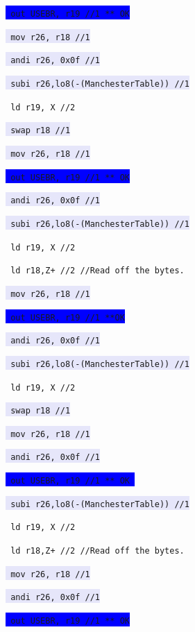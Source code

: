 \documentclass{article}
\begin{document}
\texttt{\colorbox{blue}{	out USEBR, r19 //1 ** OK} }

\texttt{\colorbox{Lavender}{	mov r26, r18   //1} }

\texttt{\colorbox{Lavender}{	andi r26, 0x0f //1} }

\texttt{\colorbox{Lavender}{	subi r26,lo8(-(ManchesterTable)) //1} }

\texttt{\colorbox{Apricot}{	ld r19, X      //2} }

\texttt{\colorbox{Lavender}{	swap r18       //1} }

\texttt{\colorbox{Lavender}{	mov r26, r18   //1} }

\texttt{\colorbox{blue}{	out USEBR, r19 //1  ** OK} }

\texttt{\colorbox{Lavender}{	andi r26, 0x0f //1} }

\texttt{\colorbox{Lavender}{	subi r26,lo8(-(ManchesterTable)) //1} }

\texttt{\colorbox{Apricot}{	ld r19, X      //2} }

\texttt{\colorbox{RedOrange}{	ld r18,Z+      //2  //Read off the bytes.} }

\texttt{\colorbox{Lavender}{	mov r26, r18   //1} }

\texttt{\colorbox{blue}{	out USEBR, r19 //1  **OK} }

\texttt{\colorbox{Lavender}{	andi r26, 0x0f //1} }

\texttt{\colorbox{Lavender}{	subi r26,lo8(-(ManchesterTable)) //1} }

\texttt{\colorbox{Apricot}{	ld r19, X      //2} }

\texttt{\colorbox{Lavender}{	swap r18       //1} }

\texttt{\colorbox{Lavender}{	mov r26, r18   //1} }

\texttt{\colorbox{Lavender}{	andi r26, 0x0f //1} }

\texttt{\colorbox{blue}{	out USEBR, r19 //1  ** OK } }

\texttt{\colorbox{Lavender}{	subi r26,lo8(-(ManchesterTable)) //1} }

\texttt{\colorbox{Apricot}{	ld r19, X      //2} }

\texttt{\colorbox{RedOrange}{	ld r18,Z+      //2  //Read off the bytes.} }

\texttt{\colorbox{Lavender}{	mov r26, r18   //1} }

\texttt{\colorbox{Lavender}{	andi r26, 0x0f //1} }

\texttt{\colorbox{blue}{	out USEBR, r19 //1 ** OK} }
\end{document}
